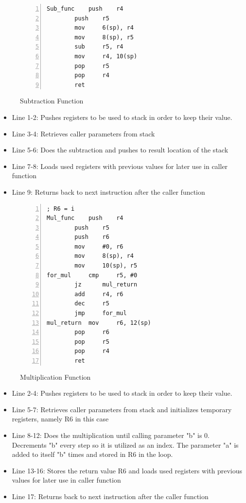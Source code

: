 \documentclass[pdftex,12pt,a4paper]{article}
\begin{document}
\begin{figure}[H]
    \centering
\begin{lstlisting}[language={[x86masm]Assembler}, numbers=left]
Sub_func	push	r4
		push	r5
		mov		6(sp), r4
		mov		8(sp), r5
		sub		r5, r4
		mov		r4, 10(sp)
		pop		r5
		pop		r4
		ret
    \end{lstlisting}
    \label{fig:subFunction}
    \caption{Subtraction Function}
\end{figure}

\begin{itemize}
    \item Line 1-2: Pushes registers to be used to stack in order to keep their value.
    \item Line 3-4: Retrieves caller parameters from stack
    \item Line 5-6: Does the subtraction and pushes to result location of the stack
    \item Line 7-8: Loads used registers with previous values for later use in caller function
    \item Line 9: Returns back to next instruction after the caller function

\end{itemize}

\begin{figure}[H]
    \centering
\begin{lstlisting}[language={[x86masm]Assembler}, numbers=left]
; R6 = i
Mul_func	push	r4
		push	r5
		push	r6
		mov		#0, r6
		mov		8(sp), r4
		mov		10(sp), r5
for_mul		cmp		r5, #0
		jz		mul_return
		add		r4, r6
		dec		r5
		jmp		for_mul
mul_return	mov		r6, 12(sp)
		pop		r6
		pop		r5
		pop		r4
		ret
    \end{lstlisting}
    \label{fig:mulFunction}
    \caption{Multiplication Function}
\end{figure}

\begin{itemize}
    \item Line 2-4: Pushes registers to be used to stack in order to keep their value.
    \item Line 5-7: Retrieves caller parameters from stack and initializes temporary registers, namely R6 in this case 
    \item Line 8-12: Does the multiplication until calling parameter "b" is 0. Decrements "b" every step so it is utilized as an index. The parameter "a" is added to itself "b" times and stored in R6 in the loop.
    \item Line 13-16: Stores the return value R6 and loads used registers with previous values for later use in caller function
    \item Line 17: Returns back to next instruction after the caller function

\end{itemize}
\end{document}

